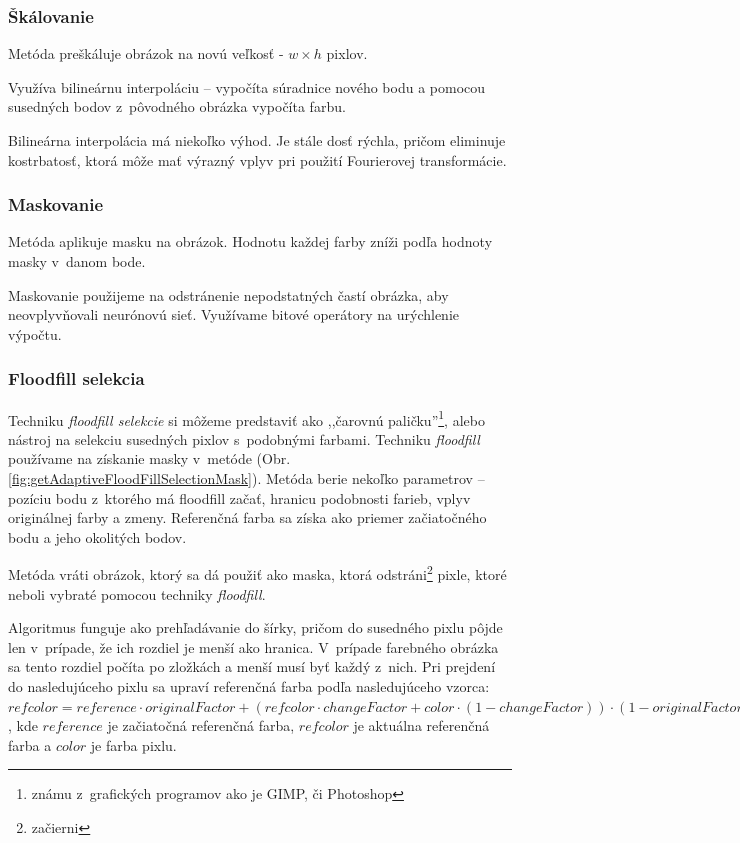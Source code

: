 \subsubsection{Škálovanie}
\label{chap:scale}
Metóda  preškáluje obrázok na novú veľkosť - $w\times h$ pixlov.

Využíva bilineárnu interpoláciu -- vypočíta súradnice nového bodu a pomocou susedných bodov z~pôvodného obrázka vypočíta farbu.

Bilineárna interpolácia má niekoľko výhod. Je stále dosť rýchla, pričom eliminuje kostrbatosť, ktorá môže mať výrazný vplyv pri použití Fourierovej transformácie.

\subsubsection{Maskovanie}

Metóda  aplikuje masku na obrázok. Hodnotu každej farby zníži podľa hodnoty masky v~danom bode.

Maskovanie použijeme na odstránenie nepodstatných častí obrázka, aby neovplyvňovali neurónovú sieť. Využívame bitové operátory na urýchlenie výpočtu. %

\subsubsection{Floodfill selekcia}
Techniku \textit{floodfill selekcie} si môžeme predstaviť ako ,,čarovnú paličku''\footnote{známu z~grafických programov ako je GIMP, či Photoshop}, alebo nástroj na selekciu susedných pixlov s~podobnými farbami. Techniku \textit{floodfill} používame na získanie masky v~metóde  (Obr. \ref{fig:getAdaptiveFloodFillSelectionMask}). Metóda berie nekoľko parametrov -- pozíciu bodu z~ktorého má floodfill začať, hranicu podobnosti farieb, vplyv originálnej farby a zmeny. Referenčná farba sa získa ako priemer začiatočného bodu a jeho okolitých bodov. 

Metóda vráti obrázok, ktorý sa dá použiť ako maska, ktorá odstráni\footnote{začierni} pixle, ktoré neboli vybraté pomocou techniky \textit{floodfill}.

Algoritmus funguje ako prehľadávanie do šírky, pričom do susedného pixlu pôjde len v~prípade, že ich rozdiel je menší ako hranica. V~prípade farebného obrázka sa tento rozdiel počíta po zložkách a menší musí byť každý z~nich. Pri prejdení do nasledujúceho pixlu sa upraví referenčná farba podľa nasledujúceho vzorca: $refcolor = reference \cdot originalFactor + (refcolor\cdot changeFactor+color \cdot (1-changeFactor)) \cdot (1-originalFactor)$, kde $reference$ je začiatočná referenčná farba, $refcolor$ je aktuálna referenčná farba a $color$ je farba pixlu.

